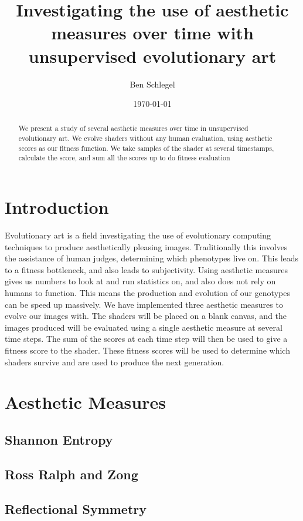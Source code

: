 \documentclass{article}
\title{Investigating the use of aesthetic measures over time with unsupervised evolutionary art}
\author{Ben Schlegel}
\date{\today}
\begin{document}
\begin{titlepage}
    \maketitle
\end{titlepage}
\begin{abstract}
    We present a study of several aesthetic measures over time in unsupervised evolutionary art. We evolve shaders without any human evaluation, using aesthetic scores as our fitness function. We take samples of the shader at several timestamps, calculate the score, and sum all the scores up to do fitness evaluation
\end{abstract}

\section*{Introduction}
Evolutionary art is a field investigating the use of evolutionary computing techniques to produce aesthetically pleasing images. Traditionally this involves the assistance of human judges, determining which phenotypes live on. This leads to a fitness bottleneck,
and also leads to subjectivity. Using aesthetic measures gives us numbers to look at and run statistics on, and also does not rely on humans to function. This means the production and evolution of our genotypes can be speed up massively. We have implemented three aesthetic measures to evolve our images with. The shaders will be placed on a blank canvas, and the images produced will be evaluated using a single aesthetic measure at several time steps. The sum of the scores at each time step will then be used to give a fitness score to the shader. These fitness scores will be used to determine which shaders 
survive and are used to produce the next generation.


\section*{Aesthetic Measures}

\subsection*{Shannon Entropy}

\subsection*{Ross Ralph and Zong}

\subsection*{Reflectional Symmetry}
\end{document}
